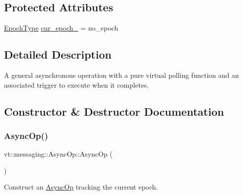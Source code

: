 \subsection*{Protected Attributes}
\begin{DoxyCompactItemize}
\item 
\hyperlink{namespacevt_a985a5adf291c34a3ca263b3378388236}{Epoch\+Type} \hyperlink{structvt_1_1messaging_1_1_async_op_a19b64071b5b952c062139c9d1b1ce15b}{cur\+\_\+epoch\+\_\+} = no\+\_\+epoch
\end{DoxyCompactItemize}


\subsection{Detailed Description}
A general asynchronous operation with a pure virtual polling function and an associated trigger to execute when it completes. 

\subsection{Constructor \& Destructor Documentation}
\mbox{\label{structvt_1_1messaging_1_1_async_op_a4d2f22c0789b0fecbaced56c3129d1d4}} 
\subsubsection{\texorpdfstring{Async\+Op()}{AsyncOp()}\hspace{0.1cm}{\footnotesize\ttfamily [1/3]}}
{\footnotesize\ttfamily vt\+::messaging\+::\+Async\+Op\+::\+Async\+Op (\begin{DoxyParamCaption}{ }\end{DoxyParamCaption})}



Construct an {\ttfamily \hyperlink{structvt_1_1messaging_1_1_async_op}{Async\+Op}} tracking the current epoch. 

\mbox{\label{structvt_1_1messaging_1_1_async_op_ad00e71b03c2ed178f06630c9443f7a22}} 

